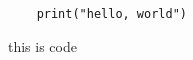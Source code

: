 \documentclass{article}              %
\begin{document}
	\begin{tcolorbox}
	\begin{verbatim}
	print("hello, world")
	\end{verbatim}
\end{tcolorbox}


\begin{tcolorbox}[left=1mm]
	this is code
\end{tcolorbox}
\end{document}
